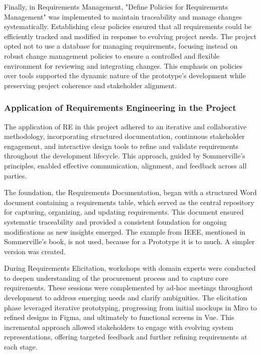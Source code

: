 Finally, in Requirements Management, "Define Policies for Requirements Management" was implemented to maintain
traceability and manage changes systematically. Establishing clear policies ensured that all requirements could be
efficiently tracked and modified in response to evolving project needs.
\autocite[cf.][p.221--222]{sommervilleRequirementsEngineeringGood1997} The project opted not to use a database for
managing requirements, focusing instead on robust change management policies to ensure a controlled and flexible
environment for reviewing and integrating changes. \autocite[cf.][p.236]{sommervilleRequirementsEngineeringGood1997}
This emphasis on policies over tools supported the dynamic nature of the prototype’s development while preserving
project coherence and stakeholder alignment.

\subsubsection{Application of Requirements Engineering in the Project}

The application of \acs{RE} in this project adhered to an iterative and collaborative methodology,
incorporating structured documentation, continuous stakeholder engagement, and interactive design tools to refine and
validate requirements throughout the development lifecycle. This approach, guided by Sommerville’s principles, enabled
effective communication, alignment, and feedback across all parties.

The foundation, the Requirements Documentation, began with a structured Word document containing a requirements table,
which served as the central repository for capturing, organizing, and updating requirements. This document ensured
systematic traceability and provided a consistent foundation for ongoing modifications as new insights emerged. The
example from \ac{IEEE}, mentioned in Sommerville's book, is not used, because for a Prototype it is to much.
\autocite[cf.][p.42--43]{sommervilleRequirementsEngineeringGood1997} A simpler version was created.

During Requirements Elicitation, workshops with domain experts were conducted to deepen understanding of the procurement
process and to capture core requirements. These sessions were complemented by ad-hoc meetings throughout development to
address emerging needs and clarify ambiguities. The elicitation phase leveraged iterative prototyping, progressing from
initial mockups in Miro to refined designs in Figma, and ultimately to functional screens in Vue. This incremental
approach allowed stakeholders to engage with evolving system representations, offering targeted feedback and further
refining requirements at each stage.

